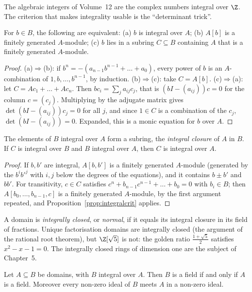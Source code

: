 The algebraic integers of Volume~12 are the complex numbers integral over $\Z$. The criterion that makes integrality usable is the ``determinant trick''.

\begin{proposition}\label{prop:integralcrit}
For $b\in B$, the following are equivalent: (a) $b$ is integral over $A$; (b) $A[b]$ is a finitely generated $A$-module; (c) $b$ lies in a subring $C\subseteq B$ containing $A$ that is a finitely generated $A$-module.
\end{proposition}

\begin{proof}
(a)$\Rightarrow$(b): if $b^n=-(a_{n-1}b^{n-1}+\dots+a_0)$, every power of $b$ is an $A$-combination of $1,b,\dots,b^{n-1}$, by induction. (b)$\Rightarrow$(c): take $C=A[b]$. (c)$\Rightarrow$(a): let $C=Ac_1+\dots+Ac_n$. Then
$bc_i=\sum_ja_{ij}c_j$, that is $(bI-(a_{ij}))c=0$ for the column $c=(c_j)$. Multiplying by the adjugate matrix gives $\det(bI-(a_{ij}))c_j=0$ for all $j$, and since $1\in C$ is a combination of the $c_j$, $\det(bI-(a_{ij}))=0$. Expanded, this is a
monic equation for $b$ over $A$.
\end{proof}

\begin{corollary}\label{cor:integralclosure}
The elements of $B$ integral over $A$ form a subring, the \emph{integral closure} of $A$ in $B$. If $C$ is integral over $B$ and $B$ integral over $A$, then $C$ is integral over $A$.
\end{corollary}

\begin{proof}
If $b,b'$ are integral, $A[b,b']$ is a finitely generated $A$-module (generated by the $b^ib'^j$ with $i,j$ below the degrees of the equations), and it contains $b\pm b'$ and $bb'$. For transitivity, $c\in C$ satisfies $c^n+b_{n-1}c^{n-1}+\dots+b_0=0$
with $b_i\in B$; then $A[b_0,\dots,b_{n-1},c]$ is a finitely generated $A$-module, by the first argument repeated, and Proposition~\ref{prop:integralcrit} applies.
\end{proof}

A domain is \emph{integrally closed}, or \emph{normal}, if it equals its integral closure in its field of fractions. Unique factorisation domains are integrally closed (the argument of the rational root theorem), but
$\Z[\sqrt5]$ is not: the golden ratio $\frac{1+\sqrt5}2$ satisfies $x^2-x-1=0$. The integrally closed rings of dimension one are the subject of Chapter~5.

\begin{lemma}\label{lem:intfield}
Let $A\subseteq B$ be domains, with $B$ integral over $A$. Then $B$ is a field if and only if $A$ is a field. Moreover every non-zero ideal of $B$ meets $A$ in a non-zero ideal.
\end{lemma}

